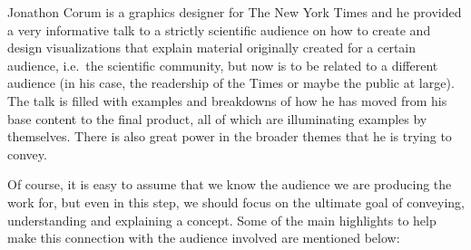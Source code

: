 \documentclass[]{book}
\begin{document}
Jonathon Corum is a graphics designer for The New York Times and he
provided a very informative talk to a strictly scientific audience on
how to create and design visualizations that explain material originally
created for a certain audience, i.e.~the scientific community, but now
is to be related to a different audience (in his case, the readership of
the Times or maybe the public at large). The talk is filled with
examples and breakdowns of how he has moved from his base content to the
final product, all of which are illuminating examples by themselves.
There is also great power in the broader themes that he is trying to
convey.

Of course, it is easy to assume that we know the audience we are
producing the work for, but even in this step, we should focus on the
ultimate goal of conveying, understanding and explaining a concept. Some
of the main highlights to help make this connection with the audience
involved are mentioned below:
\end{document}
